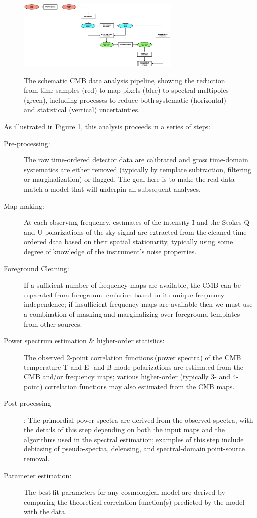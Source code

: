 \begin{figure}[htbp]
\includegraphics[width=0.7\textwidth]{Analysis/da}\\
\caption{The schematic CMB data analysis pipeline, showing the reduction from time-samples (red) to map-pixels (blue) to spectral-multipoles (green), including processes to reduce both systematic (horizontal) and statistical (vertical) uncertainties.}
\label{fig_da}
\end{figure}

As illustrated in Figure \ref{fig_da}, this analysis proceeds in a series of steps:
\begin{description}
\item[ Pre-processing:] The raw time-ordered detector data are calibrated and gross time-domain systematics are either removed (typically by template subtraction, filtering or marginalization) or flagged. The goal here is to make the real data match a model that will underpin all subsequent analyses.
\item[Map-making:] At each observing frequency, estimates of the intensity I and the Stokes Q- and U-polarizations of the sky signal are extracted from the cleaned time-ordered data based on their spatial stationarity, typically using some degree of knowledge of the instrument's noise properties.
\item[Foreground Cleaning:] If a sufficient number of frequency maps are available, the CMB can be separated from foreground emission based on its unique frequency-independence; if insufficient frequency maps are available then we must use a combination of masking and marginalizing over foreground templates from other sources.
\item[Power spectrum estimation \& higher-order statistics:] The observed 2-point correlation functions (power spectra) of the CMB temperature T and E- and B-mode polarizations are estimated from the CMB and/or frequency maps; various higher-order (typically 3- and 4-point) correlation functions may also estimated from the CMB maps.
\item[Post-processing]: The primordial power spectra are derived from the observed spectra, with the details of this step depending on both the input maps and the algorithms used in the spectral estimation; examples of this step include debiasing of pseudo-spectra, delensing, and spectral-domain point-source removal.
\item[Parameter estimation:] The best-fit parameters for any cosmological model are derived by comparing the theoretical correlation function(s) predicted by the model with the data.
\end{description}

